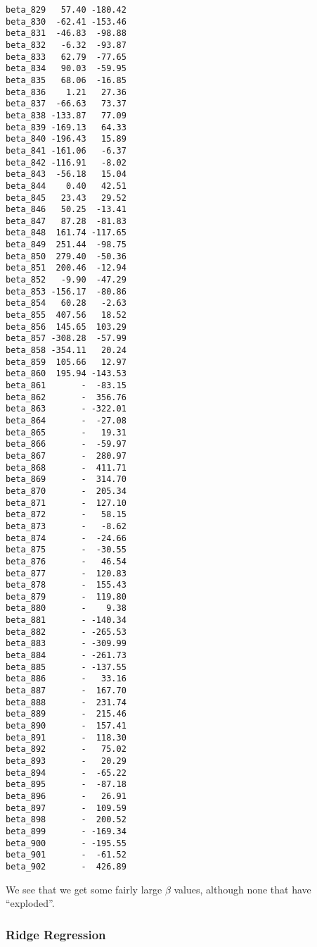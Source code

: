 \documentclass[11pt]{article}
\begin{document}
\begin{verbatim}
beta_829   57.40 -180.42
beta_830  -62.41 -153.46
beta_831  -46.83  -98.88
beta_832   -6.32  -93.87
beta_833   62.79  -77.65
beta_834   90.03  -59.95
beta_835   68.06  -16.85
beta_836    1.21   27.36
beta_837  -66.63   73.37
beta_838 -133.87   77.09
beta_839 -169.13   64.33
beta_840 -196.43   15.89
beta_841 -161.06   -6.37
beta_842 -116.91   -8.02
beta_843  -56.18   15.04
beta_844    0.40   42.51
beta_845   23.43   29.52
beta_846   50.25  -13.41
beta_847   87.28  -81.83
beta_848  161.74 -117.65
beta_849  251.44  -98.75
beta_850  279.40  -50.36
beta_851  200.46  -12.94
beta_852   -9.90  -47.29
beta_853 -156.17  -80.86
beta_854   60.28   -2.63
beta_855  407.56   18.52
beta_856  145.65  103.29
beta_857 -308.28  -57.99
beta_858 -354.11   20.24
beta_859  105.66   12.97
beta_860  195.94 -143.53
beta_861       -  -83.15
beta_862       -  356.76
beta_863       - -322.01
beta_864       -  -27.08
beta_865       -   19.31
beta_866       -  -59.97
beta_867       -  280.97
beta_868       -  411.71
beta_869       -  314.70
beta_870       -  205.34
beta_871       -  127.10
beta_872       -   58.15
beta_873       -   -8.62
beta_874       -  -24.66
beta_875       -  -30.55
beta_876       -   46.54
beta_877       -  120.83
beta_878       -  155.43
beta_879       -  119.80
beta_880       -    9.38
beta_881       - -140.34
beta_882       - -265.53
beta_883       - -309.99
beta_884       - -261.73
beta_885       - -137.55
beta_886       -   33.16
beta_887       -  167.70
beta_888       -  231.74
beta_889       -  215.46
beta_890       -  157.41
beta_891       -  118.30
beta_892       -   75.02
beta_893       -   20.29
beta_894       -  -65.22
beta_895       -  -87.18
beta_896       -   26.91
beta_897       -  109.59
beta_898       -  200.52
beta_899       - -169.34
beta_900       - -195.55
beta_901       -  -61.52
beta_902       -  426.89
    \end{verbatim}

    
    We see that we get some fairly large \(\beta\) values, although none
that have ``exploded''.

    \hypertarget{ridge-regression}{%
\subsubsection{Ridge Regression}\label{ridge-regression}}
\end{document}
